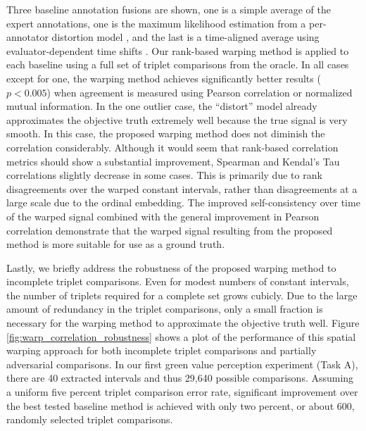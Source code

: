 \documentclass[times,twocolumn,final,authoryear]{elsarticle}
\begin{document}
Three baseline annotation fusions are shown, one is a simple average of the expert annotations, one is the maximum likelihood estimation from a per-annotator distortion model \citep{Gupta2016}, and the last is a time-aligned average using evaluator-dependent time shifts \citep{Mariooryad2015}.  Our rank-based warping method is applied to each baseline using a full set of triplet comparisons from the oracle.  In all cases except for one, the warping method achieves significantly better results ($p<0.005$) when agreement is measured using Pearson correlation or normalized mutual information.  In the one outlier case, the ``distort'' model already approximates the objective truth extremely well because the true signal is very smooth.  In this case, the proposed warping method does not diminish the correlation considerably.  Although it would seem that rank-based correlation metrics should show a substantial improvement, Spearman and Kendal's Tau correlations slightly decrease in some cases.  This is primarily due to rank disagreements over the warped constant intervals, rather than disagreements at a large scale due to the ordinal embedding.  The improved self-consistency over time of the warped signal combined with the general improvement in Pearson correlation demonstrate that the warped signal resulting from the proposed method is more suitable for use as a ground truth.

Lastly, we briefly address the robustness of the proposed warping method to incomplete triplet comparisons. Even for modest numbers of constant intervals, the number of triplets required for a complete set grows cubicly.  Due to the large amount of redundancy in the triplet comparisons, only a small fraction is necessary for the warping method to approximate the objective truth well.  Figure \ref{fig:warp_correlation_robustness} shows a plot of the performance of this spatial warping approach for both incomplete triplet comparisons and partially adversarial comparisons.  In our first green value perception experiment (Task A), there are 40 extracted intervals and thus 29,640 possible comparisons.  Assuming a uniform five percent triplet comparison error rate, significant improvement over the best tested baseline method is achieved with only two percent, or about 600, randomly selected triplet comparisons.
\end{document}
